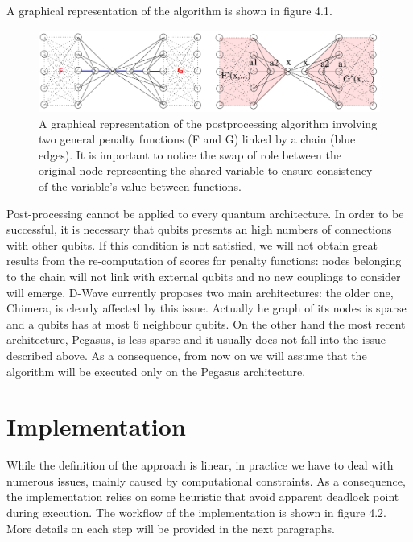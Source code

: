 A graphical representation of the algorithm is shown in figure 4.1.
\begin{figure}[b!]
	\begin{center}
	\includegraphics[width=\textwidth]{images/PostAlg.png}
	\caption{A graphical representation of the postprocessing algorithm involving two general penalty functions (F and G) linked by a chain (blue edges). It is important to notice the swap of role between the original node representing the shared variable to ensure consistency of the variable's value between functions.}
	\end{center}
\end{figure}
Post-processing cannot be applied to every quantum architecture. In order to be successful, it is necessary that qubits presents an high numbers of connections with other qubits. If this condition is not satisfied, we will not obtain great results from the re-computation of scores for penalty functions: nodes belonging to the chain will not link with external qubits and no new couplings to consider will emerge. D-Wave currently proposes two main architectures: the older one, Chimera, is clearly affected by this issue. Actually he graph of its nodes is sparse and a qubits has at most 6 neighbour qubits. On the other hand the most recent architecture, Pegasus, is less sparse and it usually does not fall into the issue described above. As a consequence, from now on we will assume that the algorithm will be executed only on the Pegasus architecture.


\section{Implementation}

While the definition of the approach is linear, in practice we have to deal with numerous issues, mainly caused by computational constraints. As a consequence, the implementation relies on some heuristic that avoid apparent deadlock point during execution.
The workflow of the implementation is shown in figure 4.2.
More details on each step will be provided in the next paragraphs.

